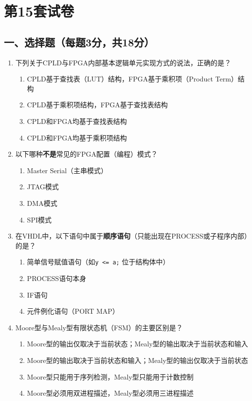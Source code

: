 \chapter{第15套试卷}

\section*{一、选择题（每题3分，共18分）}

\begin{enumerate}[label=\arabic*.]

\item 下列关于CPLD与FPGA内部基本逻辑单元实现方式的说法，正确的是？
\begin{enumerate}[label=\Alph*.]
  \item CPLD基于查找表（LUT）结构，FPGA基于乘积项（Product Term）结构
  \item CPLD基于乘积项结构，FPGA基于查找表结构
  \item CPLD和FPGA均基于查找表结构
  \item CPLD和FPGA均基于乘积项结构
\end{enumerate}

\item 以下哪种\textbf{不是}常见的FPGA配置（编程）模式？
\begin{enumerate}[label=\Alph*.]
  \item Master Serial（主串模式）
  \item JTAG模式
  \item DMA模式
  \item SPI模式
\end{enumerate}

\item 在VHDL中，以下语句中属于\textbf{顺序语句}（只能出现在PROCESS或子程序内部）的是？
\begin{enumerate}[label=\Alph*.]
  \item 简单信号赋值语句（如\verb|y <= a;| 位于结构体中）
  \item PROCESS语句本身
  \item IF语句
  \item 元件例化语句（PORT MAP）
\end{enumerate}

\item Moore型与Mealy型有限状态机（FSM）的主要区别是？
\begin{enumerate}[label=\Alph*.]
  \item Moore型的输出仅取决于当前状态；Mealy型的输出取决于当前状态和输入
  \item Moore型的输出取决于当前状态和输入；Mealy型的输出仅取决于当前状态
  \item Moore型只能用于序列检测，Mealy型只能用于计数控制
  \item Moore型必须用双进程描述，Mealy型必须用三进程描述
\end{enumerate}


\end{enumerate}
